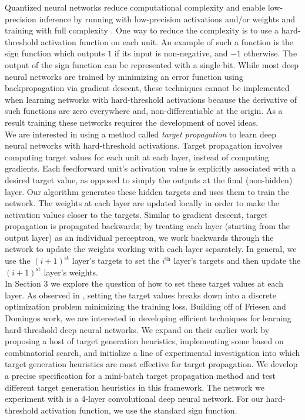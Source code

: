 Quantized neural networks reduce computational complexity and enable low-precision inference by running with low-precision activations and/or weights and training with full complexity \cite{hubara2016quantized}. One way to reduce the complexity is to use a hard-threshold activation function on each unit. An example of such a function is the sign function which outputs $1$ if its input is non-negative, and $-1$ otherwise. The output of the sign function can be represented with a single bit. While most deep neural networks are trained by minimizing an error function using backpropagation via gradient descent, these techniques cannot be implemented when learning networks with hard-threshold activations because the derivative of such functions are zero everywhere and, non-differentiable at the origin. As a result training these networks requires the development of novel ideas. \\ 

We are interested in using a method called \emph{target propagation} to learn deep neural networks with hard-threshold activations. Target propagation involves computing target values for each unit at each layer, instead of computing gradients\cite{lee2015difference}. Each feedforward unit's activation value is explicitly associated with a desired target value, as opposed to simply the outputs at the final (non-hidden) layer. Our algorithm generates these hidden targets and uses them to train the network. The weights at each layer are updated locally in order to make the activation values closer to the targets. Similar to gradient descent, target propagation is propagated backwards; by treating each layer (starting from the output layer) as an individual perceptron, we work backwards through the network to update the weights working with each layer separately\cite{lee2015difference}. In general, we use the $(i+1)^\text{st}$ layer's targets to set the $i^\text{th}$ layer's targets and then update the $(i+1)^\text{st}$ layer's weights. \\

In Section $3$ we explore the question of how to set these target values at each layer. As observed in \cite{friesen2017deep}, setting the target values breaks down into a discrete optimization problem minimizing the training loss. Building off of Friesen and Domingos work, we are interested in developing efficient techniques for learning hard-threshold deep neural networks. We expand on their earlier work by proposing a host of target generation heuristics, implementing some based on combinatorial search, and initialize a line of experimental investigation into which target generation heuristics are most effective for target propagation. We develop a precise specification for a mini-batch target propagation method and test different target generation heuristics in this framework. The network we experiment with is a 4-layer convolutional deep neural network. For our hard-threshold activation function, we use the standard sign function.\\

